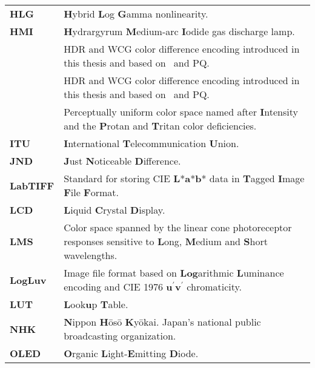 \begin{flushleft}
\begin{longtable}[c]{@{}p{28.5mm}@{} p{120.5mm}}
	\textbf{HLG}	& \textbf{H}ybrid \textbf{L}og \textbf{G}amma nonlinearity.\\
	\textbf{HMI}	& \textbf{H}ydrargyrum \textbf{M}edium-arc \textbf{I}odide gas discharge lamp.\\
	\textbf{\ICaCb}	& HDR and WCG color difference encoding introduced in this thesis and based on \IPT\ and PQ.\\
	\textbf{\ICtCp}	& HDR and WCG color difference encoding introduced in this thesis and based on \IPT\ and PQ.\\
	\textbf{\IPT}	& Perceptually uniform color space named after \textbf{I}ntensity and the \textbf{P}rotan and \textbf{T}ritan color deficiencies.\\
	\textbf{ITU}	& \textbf{I}nternational \textbf{T}elecommunication \textbf{U}nion.\\
	\textbf{JND}	& \textbf{J}ust \textbf{N}oticeable \textbf{D}ifference.\\
	\textbf{LabTIFF}& Standard for storing CIE \textbf{L}*\textbf{a}*\textbf{b}* data in \textbf{T}agged \textbf{I}mage \textbf{F}ile \textbf{F}ormat.\\
	\textbf{LCD}	& \textbf{L}iquid \textbf{C}rystal \textbf{D}isplay.\\
	\textbf{LMS}	& Color space spanned by the linear cone photoreceptor responses sensitive to \textbf{L}ong, \textbf{M}edium and \textbf{S}hort wavelengths.\\
	\textbf{LogLuv}	& Image file format based on \textbf{Log}arithmic \textbf{L}uminance encoding and CIE 1976 \textbf{u}$^\prime$\textbf{v}$^\prime$ chromaticity.\\
	\textbf{LUT}	& \textbf{L}ook\textbf{u}p \textbf{T}able.\\
	\textbf{NHK}    & \textbf{N}ippon \textbf{H}\={o}s\={o} \textbf{K}y\={o}kai. Japan's national public broadcasting organization.\\
	\textbf{OLED}	& \textbf{O}rganic \textbf{L}ight-\textbf{E}mitting \textbf{D}iode.\\

\end{longtable}
\end{flushleft}
